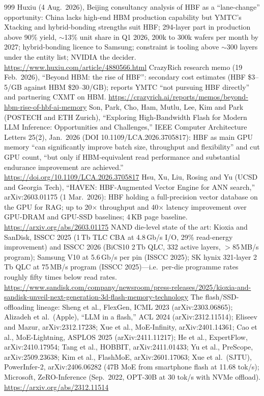 \begin{thebibliography}{999}
 Huxiu (4 Aug.\ 2026), Beijing consultancy analysis of HBF as a ``lane-change'' opportunity: China lacks high-end HBM production capability but YMTC's Xtacking and hybrid-bonding strengths suit HBF; 294-layer part in production above 90\% yield, $\sim$13\% unit share in Q1 2026, 200k to 300k wafers per month by 2027; hybrid-bonding licence to Samsung; constraint is tooling above $\sim$300 layers under the entity list; NVIDIA the decider. \url{https://www.huxiu.com/article/4880566.html}
 CrazyRich research memo (19 Feb.\ 2026), ``Beyond HBM: the rise of HBF'': secondary cost estimates (HBF \$3--5/GB against HBM \$20--30/GB); reports YMTC ``not pursuing HBF directly'' and partnering CXMT on HBM. \url{https://crazyrich.ai/reports/memos/beyond-hbm-rise-of-hbf-ai-memory}
 Son, Park, Cho, Ham, Mutlu, Lee, Kim and Park (POSTECH and ETH Zurich), ``Exploring High-Bandwidth Flash for Modern LLM Inference: Opportunities and Challenges,'' IEEE Computer Architecture Letters 25(2), Jan.\ 2026 (DOI 10.1109/LCA.2026.3705817): HBF as main GPU memory ``can significantly improve batch size, throughput and flexibility'' and cut GPU count, ``but only if HBM-equivalent read performance and substantial endurance improvement are achieved.'' \url{https://doi.org/10.1109/LCA.2026.3705817}
 Hsu, Xu, Liu, Rosing and Yu (UCSD and Georgia Tech), ``HAVEN: HBF-Augmented Vector Engine for ANN search,'' arXiv:2603.01175 (1 Mar.\ 2026): HBF holding a full-precision vector database on the GPU for RAG; up to 20$\times$ throughput and 40$\times$ latency improvement over GPU-DRAM and GPU-SSD baselines; 4\,KB page baseline. \url{https://arxiv.org/abs/2603.01175}
 NAND die-level state of the art: Kioxia and SanDisk, ISSCC 2025 (1\,Tb TLC CBA at 4.8\,Gb/s I/O, 29\% read-energy improvement) and ISSCC 2026 (BiCS10 2\,Tb QLC, 332 active layers, $>$85\,MB/s program); Samsung V10 at 5.6\,Gb/s per pin (ISSCC 2025); SK hynix 321-layer 2\,Tb QLC at 75\,MB/s program (ISSCC 2025)---i.e.\ per-die programme rates roughly fifty times below read rates. \url{https://www.sandisk.com/company/newsroom/press-releases/2025/kioxia-and-sandisk-unveil-next-generation-3d-flash-memory-technology}
 The flash/SSD-offloading lineage: Sheng et al., FlexGen, ICML 2023 (arXiv:2303.06865); Alizadeh et al.\ (Apple), ``LLM in a flash,'' ACL 2024 (arXiv:2312.11514); Eliseev and Mazur, arXiv:2312.17238; Xue et al., MoE-Infinity, arXiv:2401.14361; Cao et al., MoE-Lightning, ASPLOS 2025 (arXiv:2411.11217); He et al., ExpertFlow, arXiv:2410.17954; Tang et al., HOBBIT, arXiv:2411.01433; Yu et al., PreScope, arXiv:2509.23638; Kim et al., FlashMoE, arXiv:2601.17063; Xue et al.\ (SJTU), PowerInfer-2, arXiv:2406.06282 (47B MoE from smartphone flash at 11.68 tok/s); Microsoft, ZeRO-Inference (Sep.\ 2022, OPT-30B at 30 tok/s with NVMe offload). \url{https://arxiv.org/abs/2312.11514}

\end{thebibliography}
